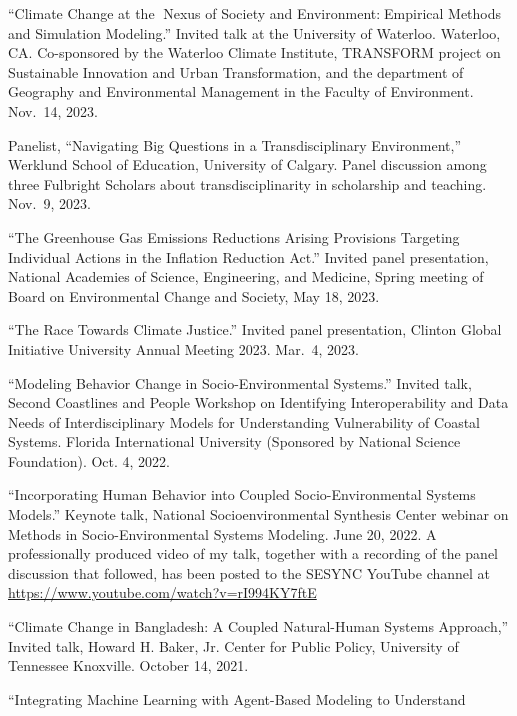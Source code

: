 %
%
\item ``Climate Change at the Nexus of Society and Environment:Empirical Methods and Simulation Modeling.''
  Invited talk at the University of Waterloo. Waterloo, CA.
  Co-sponsored by the Waterloo Climate Institute, TRANSFORM project on Sustainable Innovation and Urban Transformation, and the department of Geography and Environmental Management in the Faculty of Environment.
  Nov.~14, 2023.
\item Panelist, ``Navigating Big Questions in a Transdisciplinary Environment,'' Werklund
  School of Education, University of Calgary. Panel discussion among three Fulbright 
  Scholars about transdisciplinarity in scholarship and teaching.
  Nov.~9, 2023.
\item ``The Greenhouse Gas Emissions Reductions Arising Provisions Targeting
        Individual Actions in the Inflation Reduction Act.''
   Invited panel presentation, National Academies of Science, Engineering,
   and Medicine, Spring meeting of Board on Environmental Change and
   Society, May 18, 2023.
\item ``The Race Towards Climate Justice.''
   Invited panel presentation, Clinton Global Initiative University
   Annual Meeting 2023. Mar.~4, 2023.
\item ``Modeling Behavior Change in Socio-Environmental Systems.''
   Invited talk, Second Coastlines and People Workshop on Identifying Interoperability and Data Needs of Interdisciplinary Models for
   Understanding Vulnerability of Coastal Systems. Florida International
   University (Sponsored by National Science Foundation). Oct. 4, 2022.
\item ``Incorporating Human Behavior into Coupled Socio-Environmental Systems
   Models.'' Keynote talk, National Socioenvironmental Synthesis Center
   webinar on Methods in Socio-Environmental Systems Modeling.
   June 20, 2022. A professionally produced video of my talk, together with a
   recording of the panel discussion that followed, has been posted to the
   SESYNC YouTube channel at \url{https://www.youtube.com/watch?v=rI994KY7ftE}
\item ``Climate Change in Bangladesh: A Coupled Natural-Human Systems
   Approach,'' Invited talk, Howard H. Baker, Jr. Center for Public Policy,
   University of Tennessee Knoxville. October 14, 2021.
\item ``Integrating Machine Learning with Agent-Based Modeling to Understand
